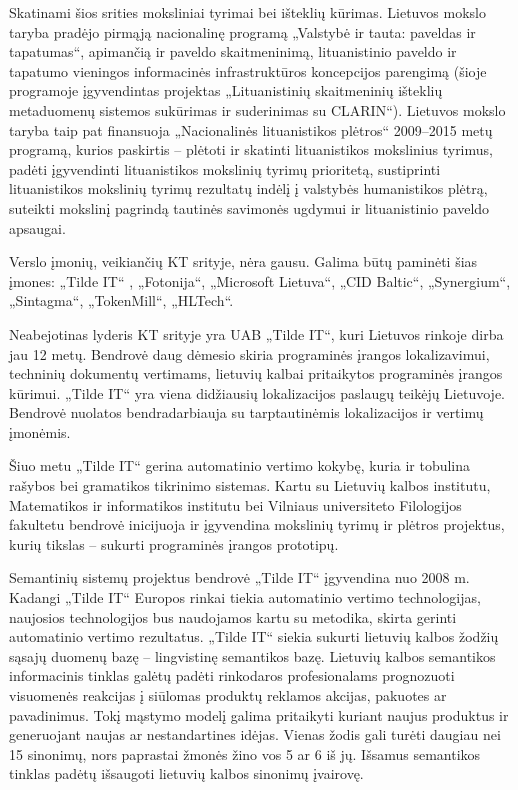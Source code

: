 \begin{multicols}{2}
Skatinami šios srities moksliniai tyrimai bei išteklių kūrimas. Lietuvos mokslo taryba pradėjo pirmąją nacionalinę programą „Valstybė ir tauta: paveldas ir tapatumas“, apimančią ir paveldo skaitmeninimą, lituanistinio paveldo ir tapatumo vieningos informacinės infrastruktūros koncepcijos parengimą (šioje programoje įgyvendintas projektas „Lituanistinių skaitmeninių išteklių metaduomenų sistemos sukūrimas ir suderinimas su CLARIN“). Lietuvos mokslo taryba taip pat finansuoja „Nacionalinės lituanistikos plėtros“ 2009–2015 metų programą, kurios paskirtis – plėtoti ir skatinti lituanistikos mokslinius tyrimus, padėti įgyvendinti lituanistikos mokslinių tyrimų prioritetą, sustiprinti lituanistikos mokslinių tyrimų rezultatų indėlį į valstybės humanistikos plėtrą, suteikti mokslinį pagrindą tautinės savimonės ugdymui ir lituanistinio paveldo apsaugai. 

Verslo įmonių, veikiančių KT srityje, nėra gausu. Galima būtų paminėti šias įmones: „Tilde IT“ , „Fotonija“, „Microsoft Lietuva“,  „CID Baltic“,  „Synergium“, „Sintagma“, „TokenMill“, „HLTech“.

    Neabejotinas lyderis KT srityje yra UAB „Tilde IT“, kuri Lietuvos rinkoje dirba jau 12 metų. Bendrovė daug dėmesio skiria programinės įrangos lokalizavimui, techninių dokumentų vertimams, lietuvių kalbai pritaikytos programinės įrangos kūrimui. „Tilde IT“ yra viena didžiausių lokalizacijos paslaugų teikėjų Lietuvoje. Bendrovė nuolatos bendradarbiauja su tarptautinėmis lokalizacijos ir vertimų įmonėmis.   

    Šiuo metu „Tilde IT“ gerina automatinio vertimo kokybę, kuria ir tobulina rašybos bei gramatikos tikrinimo sistemas. Kartu su Lietuvių kalbos institutu, Matematikos ir informatikos institutu bei Vilniaus universiteto Filologijos fakultetu bendrovė inicijuoja ir įgyvendina mokslinių tyrimų ir plėtros projektus, kurių tikslas – sukurti programinės įrangos prototipų.  

    Semantinių sistemų projektus bendrovė „Tilde IT“ įgyvendina nuo 2008 m. Kadangi „Tilde IT“ Europos rinkai tiekia automatinio vertimo technologijas, naujosios technologijos bus naudojamos kartu su metodika, skirta gerinti automatinio vertimo rezultatus. „Tilde IT“ siekia sukurti lietuvių kalbos žodžių sąsajų duomenų bazę – lingvistinę semantikos bazę. Lietuvių kalbos semantikos informacinis tinklas galėtų padėti rinkodaros profesionalams prognozuoti visuomenės reakcijas į siūlomas produktų reklamos akcijas, pakuotes ar pavadinimus. Tokį mąstymo modelį galima pritaikyti kuriant naujus produktus ir generuojant naujas ar nestandartines idėjas. Vienas žodis gali turėti daugiau nei 15 sinonimų, nors paprastai žmonės žino vos 5 ar 6 iš jų. Išsamus semantikos tinklas padėtų išsaugoti lietuvių kalbos sinonimų įvairovę.   


\end{multicols}
